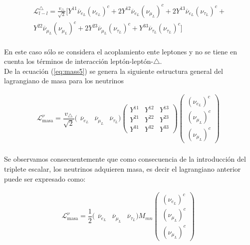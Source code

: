 \documentclass[12pt]{article}
\begin{document}
\begin{equation}
    \label{eq:mass5}
\begin{aligned}
\mathcal{L}^\triangle_{l-l}= \frac{v_\triangle}{\sqrt2} [Y^{11}\overline{\nu}_{e_L}({\nu}_{e_L})^c + 2Y^{12}\overline{\nu}_{e_L}({\nu}_{\mu_L})^c+ 2Y^{13}\overline{\nu}_{e_L}({\nu}_{\tau_L})^c+ \\
Y^{22}\overline{\nu}_{\mu_L}({\nu}_{\mu_L})^c + 2Y^{23}\overline{\nu}_{\mu_L}({\nu}_{\tau_L})^c+ Y^{33}\overline{\nu}_{\tau_L}({\nu}_{\tau_L})^c
]
\end{aligned}
\end{equation} \\

En este caso sólo se considera el acoplamiento ente leptones y no se tiene en cuenta los términos de interacción leptón-leptón-$\triangle$. \\

De la ecuación (\ref{eq:mass5}) se genera la siguiente estructura general del lagrangiano de masa para los neutrinos

\begin{equation*}
    \mathcal{L}^\nu_{\text{masa}}= \frac{v_\triangle}{\sqrt{2}} (\begin{array}{ccc}
         \overline{\nu}_{e_L} & \overline{\nu}_{\mu_L} & \overline{\nu}_{\tau_L} )\begin{pmatrix}    Y^{11} &  Y^{12} & Y^{13} \\
         Y^{21} &  Y^{22} & Y^{23}  \\
         Y^{31} &  Y^{32} & Y^{33}  \end{pmatrix}
  \begin{pmatrix}
         (\nu_{e_L})^c \\
         (\nu_{\mu_L})^c \\
         (\nu_{\mu_L})^c 
    \end{pmatrix}
    \end{array}
    \label{eq:mass1}
\end{equation*} \\

Se observamos consecuentemente que como consecuencia de la introducción del triplete escalar, los neutrinos adquieren masa, es decir el lagrangiano anterior puede ser expresado como:  

\begin{equation}
    \mathcal{L}^\nu_{\text{masa}}= \frac{1}{2} (\begin{array}{ccc}
         \overline{\nu}_{e_L} & \overline{\nu}_{\mu_L} & \overline{\nu}_{\tau_L} )M_{mn}    \begin{pmatrix}
         (\nu_{e_L})^c \\
         (\nu_{\mu_L})^c \\
         (\nu_{\mu_L})^c 
    \end{pmatrix}
    \end{array}
    \label{eq:mss2}
\end{equation} \\
\end{document}
